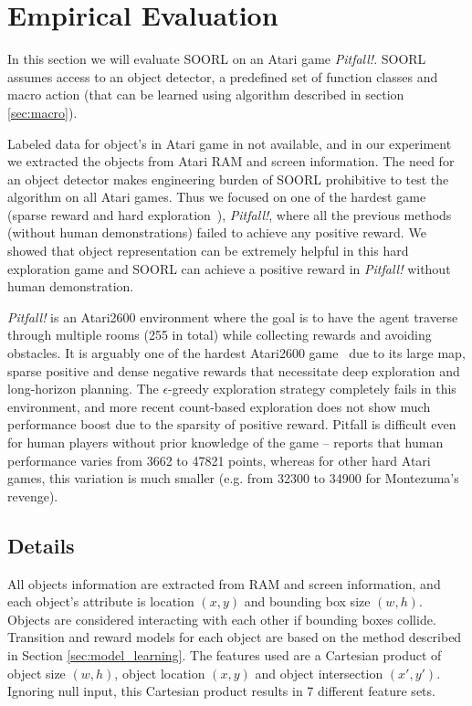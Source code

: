\section{Empirical Evaluation}\label{sec:pitfall}

In this section we will evaluate SOORL on an Atari game \textit{Pitfall!}. SOORL assumes access to an object detector, a predefined set of function classes and macro action (that can be learned using algorithm described in section \ref{sec:macro}). 

Labeled data for object's in Atari game in not available, and in our experiment we extracted the objects from Atari RAM and screen information. The need for an object detector makes engineering burden of SOORL prohibitive to test the algorithm on all Atari games. Thus we focused on one of the hardest game (sparse reward and hard exploration~\citep{bellemare2016unifying}), \textit{Pitfall!}, where all the previous methods (without human demonstrations) failed to achieve any positive reward. We showed that object representation can be extremely helpful in this hard exploration game and SOORL can achieve a positive reward in \textit{Pitfall!} without human demonstration. 

\textit{Pitfall!} is an Atari2600 environment where the goal is to have the agent traverse through multiple rooms (255 in total) while collecting rewards and avoiding obstacles. It is arguably one of the hardest Atari2600 game~\citep{hester2017deep} due to its large map, sparse positive and dense negative rewards that necessitate deep exploration and long-horizon planning. The $\epsilon$-greedy exploration strategy completely fails in this environment, and more recent count-based exploration \citep{bellemare2016unifying} does not show much performance boost due to the sparsity of positive reward. Pitfall is difficult even for human players without prior knowledge of the game -- \citep{hester2017deep} reports that human performance varies from 3662 to 47821 points, whereas for other hard Atari games, this variation is much smaller (e.g. from 32300 to 34900 for Montezuma's revenge).

\subsection{Details}
All objects information are extracted from RAM and screen information, and each object's attribute is location $(x,y)$ and bounding box size $(w,h)$. Objects are considered interacting with each other if bounding boxes collide. Transition and reward models for each object are based on the method described in Section \ref{sec:model_learning}. The features used are a Cartesian product of object size $(w,h)$, object location $(x,y)$ and object intersection $(x',y')$. Ignoring null input, this Cartesian product results in 7 different feature sets.

